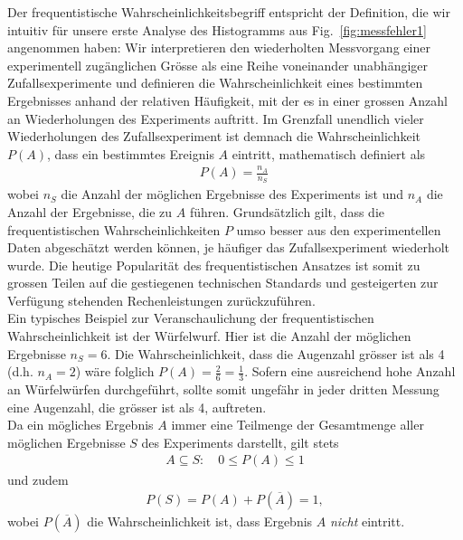 Der frequentistische Wahrscheinlichkeitsbegriff entspricht der Definition, die wir intuitiv für unsere erste Analyse des Histogramms aus Fig.~\ref{fig:messfehler1} angenommen haben: Wir interpretieren den wiederholten Messvorgang einer experimentell zugänglichen Grösse als eine Reihe voneinander unabhängiger Zufallsexperimente und definieren die Wahrscheinlichkeit eines bestimmten Ergebnisses anhand der relativen Häufigkeit, mit der es in einer grossen Anzahl an Wiederholungen des Experiments auftritt. Im Grenzfall unendlich vieler Wiederholungen des Zufallsexperiment ist demnach die Wahrscheinlichkeit $P(A)$, dass ein bestimmtes Ereignis $A$ eintritt, mathematisch definiert als 
\begin{align}
P(A) = \frac{n_A}{n_S}\,
\label{eq:vl4-1}
\end{align}
wobei $n_S$ die Anzahl der möglichen Ergebnisse des Experiments ist und $n_A$ die Anzahl der Ergebnisse, die zu $A$ führen. Grundsätzlich gilt, dass die frequentistischen Wahrscheinlichkeiten $P$ umso besser aus den experimentellen Daten abgeschätzt werden können, je häufiger das Zufallsexperiment wiederholt wurde. Die heutige Popularität des frequentistischen Ansatzes ist somit zu grossen Teilen auf die gestiegenen technischen Standards und gesteigerten zur Verfügung stehenden Rechenleistungen zurückzuführen.  \\

Ein typisches Beispiel zur Veranschaulichung der frequentistischen Wahrscheinlichkeit ist der Würfelwurf. Hier ist die Anzahl der möglichen Ergebnisse $n_S=6$. Die Wahrscheinlichkeit, dass die Augenzahl grösser ist als 4 (d.h. $n_A = 2$) wäre folglich $P(A)=\frac{2}{6}=\frac{1}{3}$. Sofern eine ausreichend hohe Anzahl an Würfelwürfen durchgeführt, sollte somit ungefähr in jeder dritten Messung eine Augenzahl, die grösser ist als 4, auftreten. \\

Da ein mögliches Ergebnis $A$ immer eine Teilmenge der Gesamtmenge aller möglichen Ergebnisse $S$ des Experiments darstellt, gilt  stets
\begin{align}
A \subseteq S:  \quad 0 \leq P ( A ) \leq 1
\end{align}
und zudem
\begin{align}
P(S) =  P(A) + P(\overline{A}) =  1,
\end{align}
wobei $P(\overline{A})$ die Wahrscheinlichkeit ist, dass Ergebnis $A$ \textit{nicht} eintritt. \\

